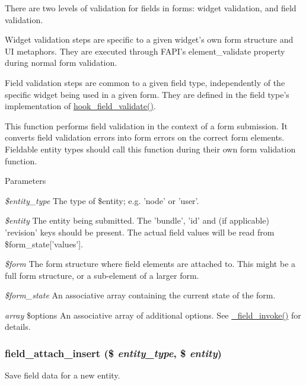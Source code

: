 There are two levels of validation for fields in forms: widget validation, and field validation.
\begin{DoxyItemize}
\item Widget validation steps are specific to a given widget's own form structure and UI metaphors. They are executed through FAPI's element\_\-validate property during normal form validation.
\item Field validation steps are common to a given field type, independently of the specific widget being used in a given form. They are defined in the field type's implementation of \hyperlink{group__field__types_gaa7d8846e8fe3766e1b3435cd50b965be}{hook\_\-field\_\-validate()}.
\end{DoxyItemize}

This function performs field validation in the context of a form submission. It converts field validation errors into form errors on the correct form elements. Fieldable entity types should call this function during their own form validation function.


\begin{DoxyParams}{Parameters}
\item[{\em \$entity\_\-type}]The type of \$entity; e.g. 'node' or 'user'. \item[{\em \$entity}]The entity being submitted. The 'bundle', 'id' and (if applicable) 'revision' keys should be present. The actual field values will be read from \$form\_\-state\mbox{[}'values'\mbox{]}. \item[{\em \$form}]The form structure where field elements are attached to. This might be a full form structure, or a sub-\/element of a larger form. \item[{\em \$form\_\-state}]An associative array containing the current state of the form. \item[{\em array}]\$options An associative array of additional options. See \hyperlink{group__field__attach_ga65f891a5eea6513f8505f5cfc5894896}{\_\-field\_\-invoke()} for details. \end{DoxyParams}
\hypertarget{group__field__attach_gad7c37d577b97db5e0c182bc570ed7cf4}{
\subsubsection[{field\_\-attach\_\-insert}]{\setlength{\rightskip}{0pt plus 5cm}field\_\-attach\_\-insert (\$ {\em entity\_\-type}, \/  \$ {\em entity})}}
\label{group__field__attach_gad7c37d577b97db5e0c182bc570ed7cf4}
Save field data for a new entity.

